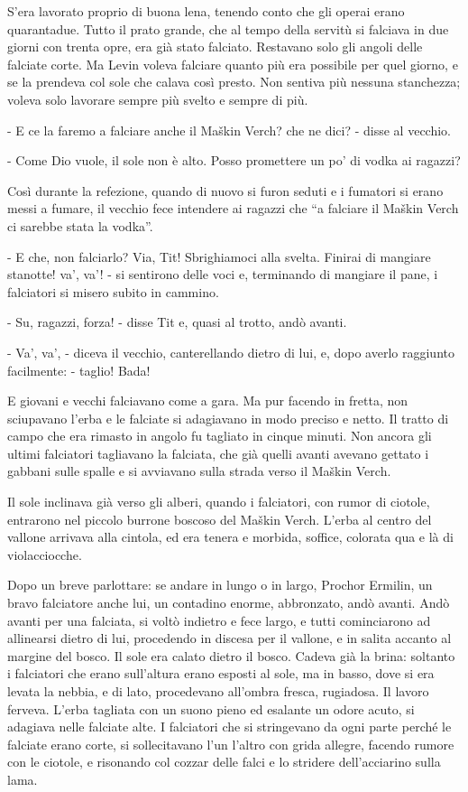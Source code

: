 S'era lavorato proprio di buona lena, tenendo conto che gli operai erano quarantadue. Tutto il prato grande, che al tempo della servitù si falciava in due giorni con trenta opre, era già stato falciato. Restavano solo gli angoli delle falciate corte. Ma Levin voleva falciare quanto più era possibile per quel giorno, e se la prendeva col sole che calava così presto. Non sentiva più nessuna stanchezza; voleva solo lavorare sempre più svelto e sempre di più. 

- E ce la faremo a falciare anche il Maškin Verch? che ne dici? - disse al vecchio. 

- Come Dio vuole, il sole non è alto. Posso promettere un po' di vodka ai ragazzi? 

Così durante la refezione, quando di nuovo si furon seduti e i fumatori si erano messi a fumare, il vecchio fece intendere ai ragazzi che ``a falciare il Maškin Verch ci sarebbe stata la vodka''. 

- E che, non falciarlo? Via, Tit! Sbrighiamoci alla svelta. Finirai di mangiare stanotte! va', va'! - si sentirono delle voci e, terminando di mangiare il pane, i falciatori si misero subito in cammino. 

- Su, ragazzi, forza! - disse Tit e, quasi al trotto, andò avanti. 

- Va', va', - diceva il vecchio, canterellando dietro di lui, e, dopo averlo raggiunto facilmente: - taglio! Bada! 

E giovani e vecchi falciavano come a gara. Ma pur facendo in fretta, non sciupavano l'erba e le falciate si adagiavano in modo preciso e netto. Il tratto di campo che era rimasto in angolo fu tagliato in cinque minuti. Non ancora gli ultimi falciatori tagliavano la falciata, che già quelli avanti avevano gettato i gabbani sulle spalle e si avviavano sulla strada verso il Maškin Verch. 

Il sole inclinava già verso gli alberi, quando i falciatori, con rumor di ciotole, entrarono nel piccolo burrone boscoso del Maškin Verch. L'erba al centro del vallone arrivava alla cintola, ed era tenera e morbida, soffice, colorata qua e là di violacciocche. 

Dopo un breve parlottare: se andare in lungo o in largo, Prochor Ermilin, un bravo falciatore anche lui, un contadino enorme, abbronzato, andò avanti. Andò avanti per una falciata, si voltò indietro e fece largo, e tutti cominciarono ad allinearsi dietro di lui, procedendo in discesa per il vallone, e in salita accanto al margine del bosco. Il sole era calato dietro il bosco. Cadeva già la brina: soltanto i falciatori che erano sull'altura erano esposti al sole, ma in basso, dove si era levata la nebbia, e di lato, procedevano all'ombra fresca, rugiadosa. Il lavoro ferveva. L'erba tagliata con un suono pieno ed esalante un odore acuto, si adagiava nelle falciate alte. I falciatori che si stringevano da ogni parte perché le falciate erano corte, si sollecitavano l'un l'altro con grida allegre, facendo rumore con le ciotole, e risonando col cozzar delle falci e lo stridere dell'acciarino sulla lama. 

